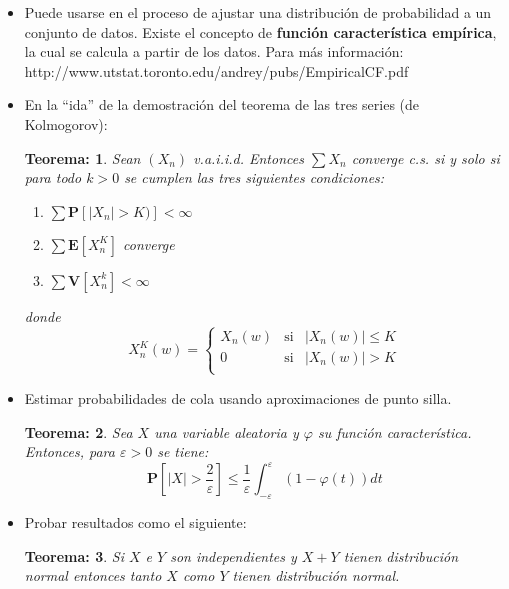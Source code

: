 \documentclass{beamer}
\newcommand{\vp}{\varphi}
\newcommand{\E}{\mathbf{E}}
\newcommand{\V}{\mathbf{V}}
\newcommand{\pro}{\mathbf{P}}
\newtheorem{teo}{Teorema:}
\begin{document}
\begin{frame}
	\begin{itemize}
		\item Puede usarse en el proceso de ajustar una distribución de probabilidad a un conjunto de datos. Existe el concepto de \textbf{función característica empírica}, la cual se calcula a partir de los datos. Para más información: http://www.utstat.toronto.edu/andrey/pubs/EmpiricalCF.pdf
		
		\item En la ``ida'' de la demostración del teorema de las tres series (de Kolmogorov): 
		
		\begin{teo}
			Sean $(X_{n})$ v.a.i.i.d. Entonces $\sum X_{n}$ converge c.s. si y solo si para todo $k>0$ se cumplen las tres siguientes condiciones:
			\begin{enumerate}
				\item $ \sum \pro [ |X_{n}|> K )] < \infty$ 
				\item $\sum \E[X_{n}^{K}] $ converge
				\item $ \sum \V [X_{n}^{k}] < \infty  $
			\end{enumerate}
			donde \[
			X_{n}^{K} (w) = \left\{ \begin{array}{rcl}
			X_{n}(w) & \mbox{si} & |X_{n}(w)| \leq K\\
			0 & \mbox{si} & |X_{n}(w)| > K\\
			\end{array}
			\right. \]
		\end{teo}
	\end{itemize}
\end{frame}

\begin{frame}
	\begin{itemize}
		\item Estimar probabilidades de cola usando aproximaciones de punto silla. 
		
		\begin{teo}
			Sea $X$ una variable aleatoria y $\vp$ su función característica. Entonces, para $\varepsilon  >0$ se tiene:
			$$ \pro [ |X|> \frac{2}{\varepsilon} ]  \leq \frac{1}{\varepsilon} \int_{-\varepsilon}^{\varepsilon }  (1 - \vp(t)) dt  $$
		\end{teo}
		
		\item Probar resultados como el siguiente:
		
		\begin{teo}
				Si $X$ e $Y$ son independientes y $X+Y$ tienen distribución normal entonces tanto $X$ como $Y$ tienen distribución normal.
		\end{teo}
	
	\end{itemize}
\end{frame}
\end{document}
